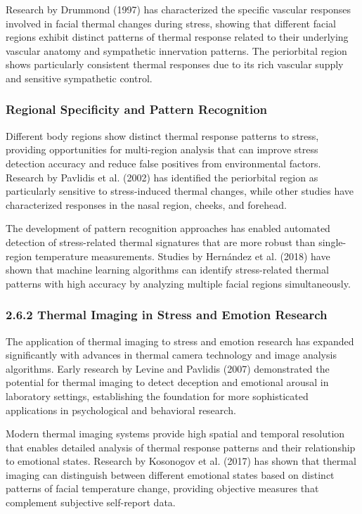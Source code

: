 \documentclass[12pt,a4paper]{article}
\begin{document}
Research by Drummond (1997) has characterized the specific vascular responses involved in facial thermal changes during
stress, showing that different facial regions exhibit distinct patterns of thermal response related to their underlying
vascular anatomy and sympathetic innervation patterns. The periorbital region shows particularly consistent thermal
responses due to its rich vascular supply and sensitive sympathetic control.

\subsubsection{Regional Specificity and Pattern Recognition}

Different body regions show distinct thermal response patterns to stress, providing opportunities for multi-region
analysis that can improve stress detection accuracy and reduce false positives from environmental factors. Research by
Pavlidis et al. (2002) has identified the periorbital region as particularly sensitive to stress-induced thermal
changes, while other studies have characterized responses in the nasal region, cheeks, and forehead.

The development of pattern recognition approaches has enabled automated detection of stress-related thermal signatures
that are more robust than single-region temperature measurements. Studies by Hernández et al. (2018) have shown that
machine learning algorithms can identify stress-related thermal patterns with high accuracy by analyzing multiple facial
regions simultaneously.

\subsubsection{2.6.2 Thermal Imaging in Stress and Emotion Research}

The application of thermal imaging to stress and emotion research has expanded significantly with advances in thermal
camera technology and image analysis algorithms. Early research by Levine and Pavlidis (2007) demonstrated the potential
for thermal imaging to detect deception and emotional arousal in laboratory settings, establishing the foundation for
more sophisticated applications in psychological and behavioral research.

Modern thermal imaging systems provide high spatial and temporal resolution that enables detailed analysis of thermal
response patterns and their relationship to emotional states. Research by Kosonogov et al. (2017) has shown that thermal
imaging can distinguish between different emotional states based on distinct patterns of facial temperature change,
providing objective measures that complement subjective self-report data.
\end{document}
